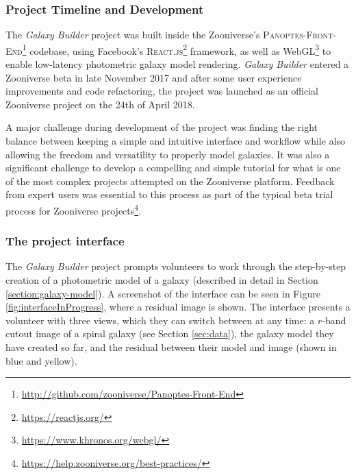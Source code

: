 \documentclass[../main.tex]{subfiles}
\begin{document}
\subsubsection{Project Timeline and Development}

The \textit{Galaxy Builder} project was built inside the Zooniverse's \citep{Simpson:2014:ZOW:2567948.2579215} \textsc{Panoptes-Front-End}\footnote{\url{http://github.com/zooniverse/Panoptes-Front-End}} codebase, using Facebook's \textsc{React.js}\footnote{\url{https://reactjs.org/}} framework, as well as WebGL\footnote{\url{https://www.khronos.org/webgl/}} to enable low-latency photometric galaxy model rendering. \textit{Galaxy Builder} entered a Zooniverse beta in late November 2017 and after some user experience improvements and code refactoring, the project was launched as an official Zooniverse project on the 24th of April 2018.

A major challenge during development of the project was finding the right balance between keeping a simple and intuitive interface and workflow while also allowing the freedom and versatility to properly model galaxies. It was also a significant challenge to develop a compelling and simple tutorial for what is one of the most complex projects attempted on the Zooniverse platform. Feedback from expert users was essential to this process as part of the typical beta trial process for Zooniverse projects\footnote{\url{https://help.zooniverse.org/best-practices/}}.


\subsubsection{The project interface}

The \textit{Galaxy Builder} project prompts volunteers to work through the step-by-step creation of a photometric model of a galaxy (described in detail in Section \ref{section:galaxy-model}). A screenshot of the interface can be seen in Figure \ref{fig:interfaceInProgress}, where a residual image is shown. The interface presents a volunteer with three views, which they can switch between at any time: a $r$-band cutout image of a spiral galaxy (see Section \ref{sec:data}), the galaxy model they have created so far, and the residual between their model and image (shown in blue and yellow).
\end{document}
